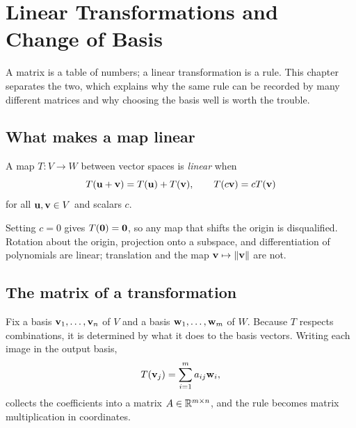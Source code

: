 \setchapterpreamble[u]{\margintoc}
\chapter{Linear Transformations and Change of Basis}


A matrix is a table of numbers; a linear transformation is a rule. This chapter
separates the two, which explains why the same rule can be recorded by many
different matrices and why choosing the basis well is worth the trouble.

\section{What makes a map linear}

\begin{definition}
A map \(T:V\to W\) between vector spaces is \emph{linear} when
\[
	T(\mathbf{u}+\mathbf{v})=T(\mathbf{u})+T(\mathbf{v}),
	\qquad
	T(c\mathbf{v})=cT(\mathbf{v})
\]
for all \(\mathbf{u},\mathbf{v}\in V\) and scalars \(c\).
\end{definition}

Setting \(c=0\) gives \(T(\mathbf{0})=\mathbf{0}\), so any map that shifts the origin
is disqualified. Rotation about the origin, projection onto a subspace, and
differentiation of polynomials are linear; translation and the map
\(\mathbf{v}\mapsto\lVert\mathbf{v}\rVert\) are not.


\section{The matrix of a transformation}

Fix a basis \(\mathbf{v}_1,\ldots,\mathbf{v}_n\) of \(V\) and a basis
\(\mathbf{w}_1,\ldots,\mathbf{w}_m\) of \(W\). Because \(T\) respects combinations,
it is determined by what it does to the basis vectors. Writing each image in the
output basis,
\[
	T(\mathbf{v}_j)=\sum_{i=1}^{m}a_{ij}\mathbf{w}_i,
\]
collects the coefficients into a matrix \(A\in\mathbb{R}^{m\times n}\), and the rule
becomes matrix multiplication in coordinates.

